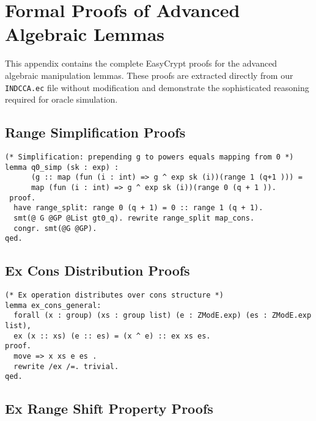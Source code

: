 \chapter{Formal Proofs of Advanced Algebraic Lemmas}
\label{appendix:advanced-lemma-proofs}

This appendix contains the complete EasyCrypt proofs for the advanced algebraic manipulation lemmas. These proofs are extracted directly from our \texttt{INDCCA.ec} file without modification and demonstrate the sophisticated reasoning required for oracle simulation.

\section{Range Simplification Proofs}
\label{sec:range-simplification-proofs}

\begin{lstlisting}[style=easycrypt, caption=Proof of Range Simplification, breaklines=true, breakatwhitespace=true, frame=single, keepspaces=true]
(* Simplification: prepending g to powers equals mapping from 0 *)
lemma q0_simp (sk : exp) :
      (g :: map (fun (i : int) => g ^ exp sk (i))(range 1 (q+1 ))) =
      map (fun (i : int) => g ^ exp sk (i))(range 0 (q + 1 )).
 proof. 
  have range_split: range 0 (q + 1) = 0 :: range 1 (q + 1).
  smt(@ G @GP @List gt0_q). rewrite range_split map_cons.
  congr. smt(@G @GP).
qed.
\end{lstlisting}

\section{Ex Cons Distribution Proofs}
\label{sec:ex-cons-proofs}

\begin{lstlisting}[style=easycrypt, caption=Proof of Ex Cons Distribution, breaklines=true, breakatwhitespace=true, frame=single, keepspaces=true]
(* Ex operation distributes over cons structure *)
lemma ex_cons_general:
  forall (x : group) (xs : group list) (e : ZModE.exp) (es : ZModE.exp list),
  ex (x :: xs) (e :: es) = (x ^ e) :: ex xs es.
proof.
  move => x xs e es .
  rewrite /ex /=. trivial.
qed.
\end{lstlisting}

\section{Ex Range Shift Property Proofs}
\label{sec:ex-range-shift-proofs}

